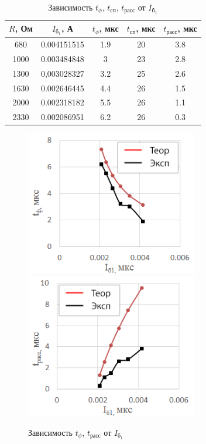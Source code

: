 \begin{table}[H]
	\begin{center}
	\caption{Зависимость $t_\phi$, $t_\text{сп}$, $t_\text{расс}$ от $I_{\text{б}_1}$}
		\begin{tabular}{|c|c|c|c|c|}
		\hline 
		$R$, Ом & $I_{\text{б}_1}$, А & $t_\phi$, мкс & $t_\text{сп}$, мкс & $t_\text{расс}$, мкс \\ 
		\hline 
		680	& 0.004151515 &	1.9 & 20 & 3.8 \\
		\hline
		1000 & 0.003484848 & 3 & 23 & 2.8 \\
		\hline
		1300 &	0,003028327 & 3.2 &	25 & 2.6 \\ 
		\hline
		1630 & 0.002646445 & 4.4 & 26 &	1.5 \\
		\hline
		2000 &	0.002318182 & 5.5 &	26 & 1.1 \\
		\hline
		2330 & 0.002086951 & 6.2 & 26 & 0.3 \\
		\hline
		\end{tabular} 
		\label{tab:ib1}
	\end{center}
\end{table}
\vspace{-1.5cm}
\begin{figure}[H]
	\begin{center}
		\includegraphics[width=7.5cm]{img/tf_ib1}
		\includegraphics[width=7.5cm]{img/trass_ib1}
		\caption{Зависимость $t_\phi$, $t_\text{расс}$ от $I_{\text{б}_1}$}
		\label{fig:ib1} %
	\end{center}
\end{figure}

